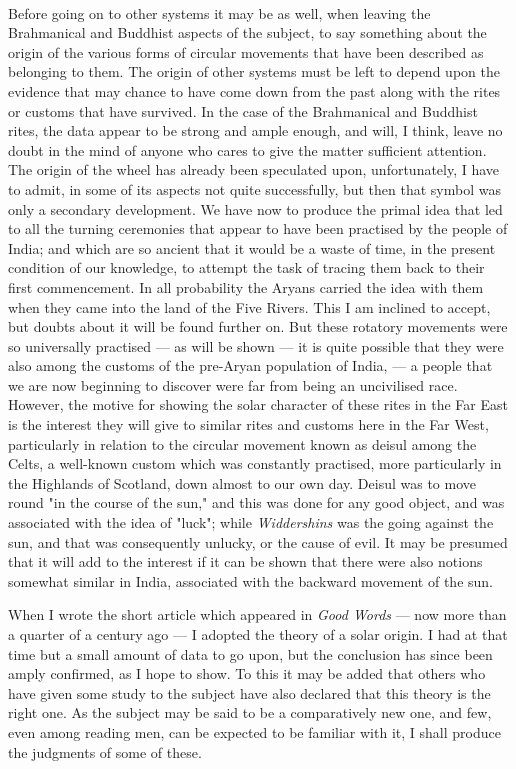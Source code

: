 \documentclass[a4paper, 11pt, oneside, polutonikogreek, english]{article}
\begin{document}
\paragraph{}
Before going on to other systems it may be as well, when leaving the Brahmanical and Buddhist aspects of the subject, to say something about the origin of the various forms of circular movements that have been described as belonging to them. The origin of other systems must be left to depend upon the evidence that may chance to have come down from the past along with the rites or customs that have survived. In the case of the Brahmanical and Buddhist rites, the data appear to be strong and ample enough, and will, I think, leave no doubt in the mind of anyone who cares to give the matter sufficient attention. The origin of the wheel has already been speculated upon, unfortunately, I have to admit, in some of its aspects not quite successfully, but then that symbol was only a secondary development. We have now to produce the primal idea that led to all the turning ceremonies that appear to have been practised by the people of India; and which are so ancient that it would be a waste of time, in the present condition of our knowledge, to attempt the task of tracing them back to their first commencement. In all probability the Aryans carried the idea with them when they came into the land of the Five Rivers. This I am inclined to accept, but doubts about it will be found further on. But these rotatory movements were so universally practised --- as will be shown --- it is quite possible that they were also among the customs of the pre-Aryan population of India, --- a people that we are now beginning to discover were far from being an uncivilised race. However, the motive for showing the solar character of these rites in the Far East is the interest they will give to similar rites and customs here in the Far West, particularly in relation to the circular movement known as deisul among the Celts, a well-known custom which was constantly practised, more particularly in the Highlands of Scotland, down almost to our own day. Deisul was to move round "in the course of the sun," and this was done for any good object, and was associated with the idea of "luck"; while \emph{Widdershins} was the going against the sun, and that was consequently unlucky, or the cause of evil. It may be presumed that it will add to the interest if it can be shown that there were also notions somewhat similar in India, associated with the backward movement of the sun.

When I wrote the short article which appeared in \emph{Good Words} --- now more than a quarter of a century ago --- I adopted the theory of a solar origin. I had at that time but a small amount of data to go upon, but the conclusion has since been amply confirmed, as I hope to show. To this it may be added that others who have given some study to the subject have also declared that this theory is the right one. As the subject may be said to be a comparatively new one, and few, even among reading men, can be expected to be familiar with it, I shall produce the judgments of some of these.
\end{document}
